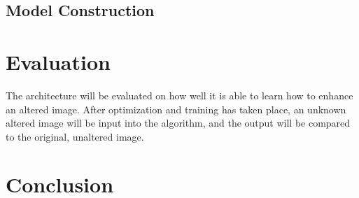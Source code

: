 \documentclass[letterpaper]{article} %
\begin{document}
\subsection{Model Construction}
\label{subsec:model}

\section{Evaluation}
\label{sec:methods/evaluation}
The architecture will be evaluated on how well it is able to learn how to
enhance an altered image. After optimization and training has taken place,
an unknown altered image will be input into the algorithm, and the output
will be compared to the original, unaltered image.

\section{Conclusion}
\label{sec:conclusion}

\cite{3D_capsule_networks}
\cite{combining_multiple_cnn}
\cite{conditional_image_generation}
\cite{deep_video_prediction}
\cite{fusionnet}
\cite{generative_adversarial_networks}
\cite{image_to_image}
\cite{show_and_tell}
\cite{pixelcnn++}
\cite{pose_cnn}
\cite{pose_guided_image_generation}
\cite{unsupervised_learning}
\cite{dcgan_git}



\end{document}
